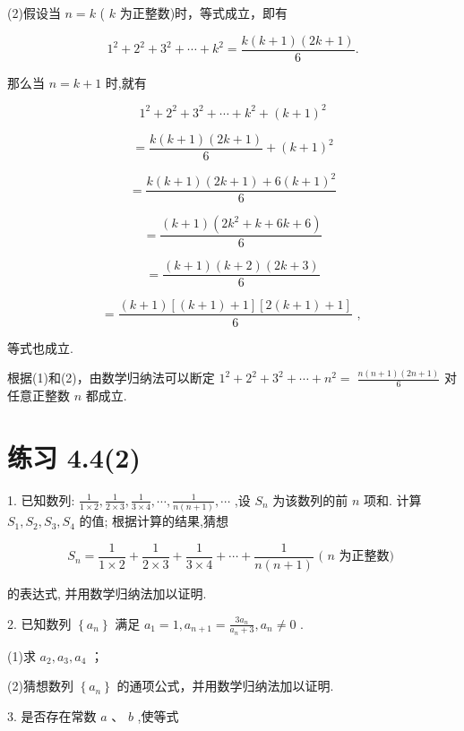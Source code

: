 \documentclass[10pt]{article}
\begin{document}
(2)假设当 \(n = k\) ( \(k\) 为正整数)时，等式成立，即有

\[
{1}^{2} + {2}^{2} + {3}^{2} + \cdots  + {k}^{2} = \frac{k\left( {k + 1}\right) \left( {{2k} + 1}\right) }{6}.
\]

那么当 \(n = k + 1\) 时,就有

\[
{1}^{2} + {2}^{2} + {3}^{2} + \cdots  + {k}^{2} + {\left( k + 1\right) }^{2}
\]

\[
= \frac{k\left( {k + 1}\right) \left( {{2k} + 1}\right) }{6} + {\left( k + 1\right) }^{2}
\]

\[
= \frac{k\left( {k + 1}\right) \left( {{2k} + 1}\right)  + 6{\left( k + 1\right) }^{2}}{6}
\]

\[
= \frac{\left( {k + 1}\right) \left( {2{k}^{2} + k + {6k} + 6}\right) }{6}
\]

\[
= \frac{\left( {k + 1}\right) \left( {k + 2}\right) \left( {{2k} + 3}\right) }{6}
\]

\[
= \frac{\left( {k + 1}\right) \left\lbrack  {\left( {k + 1}\right)  + 1}\right\rbrack  \left\lbrack  {2\left( {k + 1}\right)  + 1}\right\rbrack  }{6}\text{ , }
\]

等式也成立.

根据(1)和(2)，由数学归纳法可以断定 \({1}^{2} + {2}^{2} + {3}^{2} + \cdots  + {n}^{2} = \; \frac{n\left( {n + 1}\right) \left( {{2n} + 1}\right) }{6}\) 对任意正整数 \(n\) 都成立.

\section*{练习 4.4(2)}

1. 已知数列: \(\frac{1}{1 \times  2},\frac{1}{2 \times  3},\frac{1}{3 \times  4},\cdots ,\frac{1}{n\left( {n + 1}\right) },\cdots\) ,设 \({S}_{n}\) 为该数列的前 \(n\) 项和. 计算 \({S}_{1},{S}_{2},{S}_{3},{S}_{4}\) 的值; 根据计算的结果,猜想

\[
{S}_{n} = \frac{1}{1 \times  2} + \frac{1}{2 \times  3} + \frac{1}{3 \times  4} + \cdots  + \frac{1}{n\left( {n + 1}\right) }\text{ ( }n\text{ 为正整数) }
\]

的表达式, 并用数学归纳法加以证明.

2. 已知数列 \(\left\{  {a}_{n}\right\}\) 满足 \({a}_{1} = 1,{a}_{n + 1} = \frac{3{a}_{n}}{{a}_{n} + 3},{a}_{n} \neq  0\) .

(1)求 \({a}_{2},{a}_{3},{a}_{4}\) ；

(2)猜想数列 \(\left\{  {a}_{n}\right\}\) 的通项公式，并用数学归纳法加以证明.

3. 是否存在常数 \(a\text{ 、 }b\) ,使等式
\end{document}
